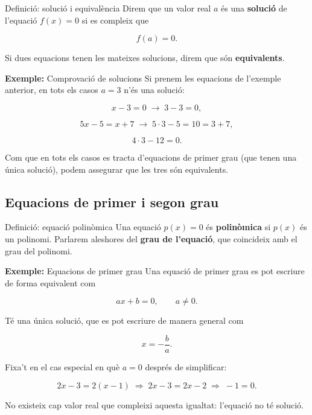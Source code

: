 \begin{definicio}{Definició: solució i equivalència}
Direm que un valor real $a$ és una \textbf{solució} de l'equació $f(x)=0$ si es compleix que

\[
f(a)=0.
\]

Si dues equacions tenen les mateixes solucions, direm que són \textbf{equivalents}.
\end{definicio}

\begin{exemple}{\textbf{Exemple:} Comprovació de solucions}
Si prenem les equacions de l'exemple anterior, en tots els casos $a=3$ n'és una solució:

\[
x-3=0 \;\longrightarrow\; 3-3=0,
\]

\[
5x-5=x+7 \;\longrightarrow\; 5\cdot 3-5=10=3+7,
\]

\[
4\cdot 3-12=0.
\]

Com que en tots els casos es tracta d'equacions de primer grau (que tenen una única solució), podem assegurar que les tres són equivalents.
\end{exemple}

\subsection{Equacions de primer i segon grau}

\begin{definicio}{Definició: equació polinòmica}
Una equació $p(x)=0$ és \textbf{polinòmica} si $p(x)$ és un polinomi. Parlarem aleshores del \textbf{grau de l'equació}, que coincideix amb el grau del polinomi.
\end{definicio}

\begin{exemple}{\textbf{Exemple:} Equacions de primer grau}
Una equació de primer grau es pot escriure de forma equivalent com

\[
ax+b=0, \qquad a\neq 0.
\]

Té una única solució, que es pot escriure de manera general com

\[
x=-\frac{b}{a}.
\]

Fixa't en el cas especial en què $a=0$ després de simplificar:

\[
2x-3=2(x-1) \;\Rightarrow\; 2x-3=2x-2 \;\Rightarrow\; -1=0.
\]

No existeix cap valor real que compleixi aquesta igualtat: l'equació no té solució.
\end{exemple}

